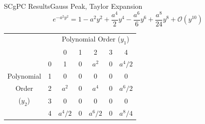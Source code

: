 \documentclass{beamer}
\begin{document}
\begin{frame}{SCgPC Results}{Gauss Peak, Taylor Expansion}\vspace{-20pt}
\begin{equation*}
  e^{-a^2y^2} = 1 - a^2y^2 + \frac{a^4}{2}y^4 - \frac{a^6}{6}y^6 + \frac{a^8}{24}y^8 + \mathcal{O}(y^{10})
\end{equation*}
\begin{table}
  \centering
  \begin{tabular}{|c c|c c c c c|}
    \cline{3-7}\multicolumn{2}{c|}{ } & \multicolumn{5}{c|}{Polynomial Order ($y_1$)} \\
\multicolumn{2}{c|}{ } & 0       & 1 & 2       & 3 & 4       \\
    \hline         & 0 & 1       & 0 & $a^2$   & 0 & $a^4/2$ \\
Polynomial         & 1 & 0       & 0 & 0       & 0 & 0       \\
Order              & 2 & $a^2$   & 0 & $a^4$   & 0 & $a^6/2$ \\
($y_2$)            & 3 & 0       & 0 & 0       & 0 & 0       \\
                   & 4 & $a^4/2$ & 0 & $a^6/2$ & 0 & $a^8/4$ \\
    \hline
  \end{tabular}
\end{table}
\end{frame}
\end{document}
